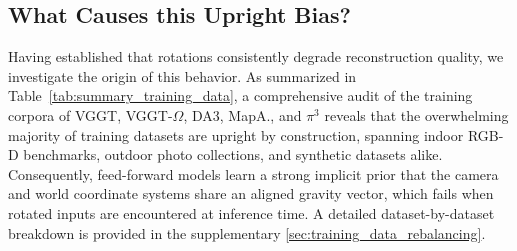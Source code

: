 \subsection{What Causes this Upright Bias?}
\label{ssec:data_audit}


\vspace{-2mm}

Having established that rotations consistently degrade reconstruction quality, we investigate the origin of this behavior. 
As summarized in Table~\ref{tab:summary_training_data}, a comprehensive audit of the training corpora of VGGT, VGGT-$\Omega$, DA3, MapA., and $\pi^3$ reveals that the overwhelming majority of training datasets are upright by construction, spanning indoor RGB-D benchmarks, outdoor photo collections, and synthetic datasets alike. Consequently, feed-forward models learn a strong implicit prior that the camera and world coordinate systems share an aligned gravity vector, which fails when rotated inputs are encountered at inference time. A detailed dataset-by-dataset breakdown is provided in the supplementary \cref{sec:training_data_rebalancing}.

